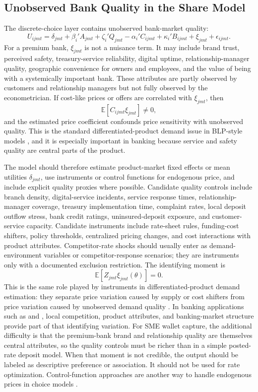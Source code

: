 \documentclass[11pt]{article}
\begin{document}
\subsection{Unobserved Bank Quality in the Share Model}

The discrete-choice layer contains unobserved bank-market quality:
\[
  U_{ijmt}
  =
  \delta_{jmt}
  +\beta_i'A_{jmt}
  +\zeta_i'Q_{jmt}
  -\alpha_i'C_{ijmt}
  +\kappa_i'B_{ijmt}
  +\xi_{jmt}
  +\epsilon_{ijmt}.
\]
For a premium bank, $\xi_{jmt}$ is not a nuisance term. It may include brand
trust, perceived safety, treasury-service reliability, digital uptime,
relationship-manager quality, geographic convenience for owners and employees,
and the value of being with a systemically important bank. These attributes are
partly observed by customers and relationship managers but not fully observed
by the econometrician. If cost-like prices or offers are correlated with
$\xi_{jmt}$,
then
\[
  \mathbb{E}[C_{ijmt}\xi_{jmt}]\neq0,
\]
and the estimated price coefficient confounds price sensitivity with unobserved
quality. This is the standard differentiated-product demand issue in BLP-style
models \citep{berry1995automobile,nevo2001cereal}, and it is especially
important in banking because service and safety quality are central parts of
the product.

The model should therefore estimate product-market fixed effects or mean
utilities $\delta_{jmt}$, use instruments or control functions for endogenous
price, and include explicit quality proxies where possible. Candidate quality
controls include branch density, digital-service incidents, service response
times, relationship-manager coverage, treasury implementation time, complaint
rates, local deposit outflow stress, bank credit ratings, uninsured-deposit
exposure, and customer-service capacity. Candidate instruments include
rate-sheet rules, funding-cost shifters, policy thresholds, centralized pricing
changes, and cost interactions with product attributes. Competitor-rate shocks
should usually enter as demand-environment variables or competitor-response
scenarios; they are instruments only with a documented exclusion restriction.
The identifying moment is
\[
  \mathbb{E}[Z_{jmt}\xi_{jmt}(\theta)]=0.
\]
This is the same role played by instruments in differentiated-product demand
estimation: they separate price variation caused by supply or cost shifters
from price variation caused by unobserved demand quality
\citep{berry1995automobile,nevo2001cereal}. In banking applications such as
\citet{dick2008demand} and \citet{egan2017deposit}, local competition, product
attributes, and banking-market structure provide part of that identifying
variation. For SME wallet capture, the additional difficulty is that the
premium-bank brand and relationship quality are themselves central attributes,
so the quality controls must be richer than in a simple posted-rate deposit
model.
When that moment is not credible, the output should be labeled as descriptive
preference or association. It should not be used for rate optimization.
Control-function approaches are another way to handle endogenous prices in
choice models \citep{petrin2010control,wooldridge2015control}.
\end{document}
